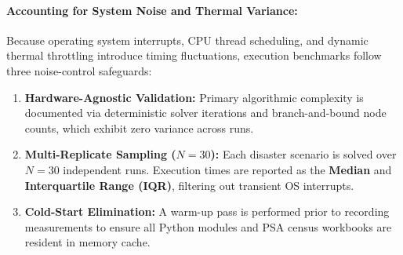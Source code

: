 \paragraph{Accounting for System Noise and Thermal Variance:}
Because operating system interrupts, CPU thread scheduling, and dynamic thermal throttling introduce timing fluctuations, execution benchmarks follow three noise-control safeguards:
\begin{enumerate}
    \item \textbf{Hardware-Agnostic Validation:} Primary algorithmic complexity is documented via deterministic solver iterations and branch-and-bound node counts, which exhibit zero variance across runs.
    \item \textbf{Multi-Replicate Sampling ($N = 30$):} Each disaster scenario is solved over $N = 30$ independent runs. Execution times are reported as the \textbf{Median} and \textbf{Interquartile Range (IQR)}, filtering out transient OS interrupts.
    \item \textbf{Cold-Start Elimination:} A warm-up pass is performed prior to recording measurements to ensure all Python modules and PSA census workbooks are resident in memory cache.
\end{enumerate}

